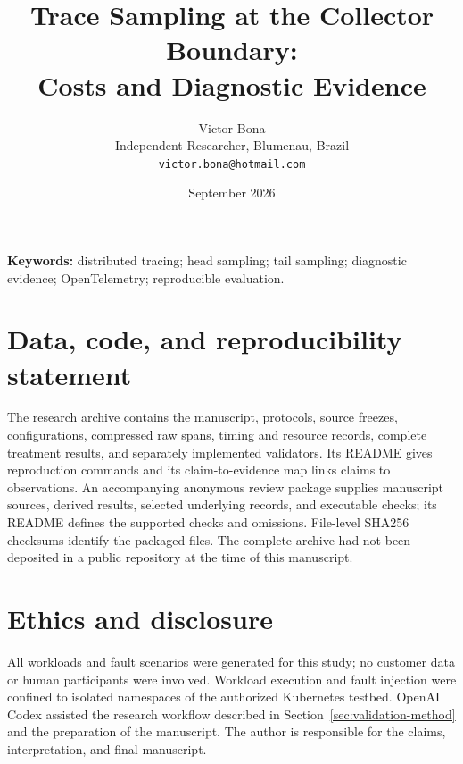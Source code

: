 \documentclass[11pt]{article}
\title{Trace Sampling at the Collector Boundary:\\Costs and Diagnostic Evidence}
\author{Victor Bona\\[2pt]
\small Independent Researcher, Blumenau, Brazil\\
\small \texttt{victor.bona@hotmail.com}}
\date{September 2026}
\theoremstyle{definition}
\begin{document}
\maketitle
\begin{abstract}

\end{abstract}
\noindent\textbf{Keywords:} distributed tracing; head sampling; tail sampling; diagnostic evidence; OpenTelemetry; reproducible evaluation.









\section*{Data, code, and reproducibility statement}
The research archive contains the manuscript, protocols, source freezes, configurations, compressed raw spans, timing and resource records, complete treatment results, and separately implemented validators. Its README gives reproduction commands and its claim-to-evidence map links claims to observations. An accompanying anonymous review package supplies manuscript sources, derived results, selected underlying records, and executable checks; its README defines the supported checks and omissions. File-level SHA256 checksums identify the packaged files. The complete archive had not been deposited in a public repository at the time of this manuscript.

\section*{Ethics and disclosure}
All workloads and fault scenarios were generated for this study; no customer data or human participants were involved. Workload execution and fault injection were confined to isolated namespaces of the authorized Kubernetes testbed. OpenAI Codex assisted the research workflow described in Section~\ref{sec:validation-method} and the preparation of the manuscript. The author is responsible for the claims, interpretation, and final manuscript.

\begingroup
{}
\setlength{\bibsep}{5pt plus 1pt}


\endgroup
\clearpage
\appendix

\end{document}
